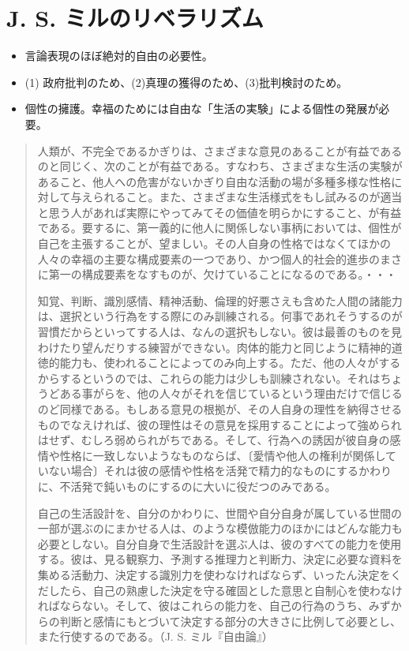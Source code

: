 \documentclass[uplatex,dvipdfmx]{jsarticle}
\begin{document}
\section{J. S. ミルのリベラリズム}

\begin{itemize}
\item 言論表現のほぼ絶対的自由の必要性。
\item (1) 政府批判のため、(2)真理の獲得のため、(3)批判検討のため。
\item 個性の擁護。幸福のためには自由な「生活の実験」による個性の発展が必要。
\end{itemize}


\begin{quotation} \small{}人類が、不完全であるかぎりは、さまざまな意見のあることが有益であるのと同じく、次のことが有益である。すなわち、さまざまな生活の実験があること、他人への危害がないかぎり自由な活動の場が多種多様な性格に対して与えられること。また、さまざまな生活様式をもし試みるのが適当と思う人があれば実際にやってみてその価値を明らかにすること、が有益である。要するに、第一義的に他人に関係しない事柄においては、個性が自己を主張することが、望ましい。その人自身の性格ではなくてほかの人々の幸福の主要な構成要素の一つであり、かつ個人的社会的進歩のまさに第一の構成要素をなすものが、欠けていることになるのである。・・・

  知覚、判断、識別感情、精神活動、倫理的好悪さえも含めた人間の諸能力は、選択という行為をする際にのみ訓練される。何事であれそうするのが習慣だからといってする人は、なんの選択もしない。彼は最善のものを見わけたり望んだりする練習ができない。肉体的能力と同じように精神的道徳的能力も、使われることによってのみ向上する。ただ、他の人々がするからするというのでは、これらの能力は少しも訓練されない。それはちょうどある事がらを、他の人々がそれを信じているという理由だけで信じるのど同様である。もしある意見の根拠が、その人自身の理性を納得させるものでなえければ、彼の理性はその意見を採用することによって強められはせず、むしろ弱められがちである。そして、行為への誘因が彼自身の感情や性格に一致しないようなものならば、〔愛情や他人の権利が関係していない場合〕それは彼の感情や性格を活発で精力的なものにするかわりに、不活発で鈍いものにするのに大いに役だつのみである。

  自己の生活設計を、自分のかわりに、世間や自分自身が属している世間の一部が選ぶのにまかせる人は、のような模倣能力のほかにはどんな能力も必要としない。自分自身で生活設計を選ぶ人は、彼のすべての能力を使用する。彼は、見る観察力、予測する推理力と判断力、決定に必要な資料を集める活動力、決定する識別力を使わなければならず、いったん決定をくだしたら、自己の熟慮した決定を守る確固とした意思と自制心を使わなければならない。そして、彼はこれらの能力を、自己の行為のうち、みずからの判断と感情にもとづいて決定する部分の大きさに比例して必要とし、また行使するのである。（J. S. ミル『自由論』）
\end{quotation}

\fi






\nocite{bentham1789:_introd_to_princ_of_moral_and_legis}
\nocite{bentham1825:_ration_of_rewar}


\ifx\mybook\undefined
  

\end{document}
